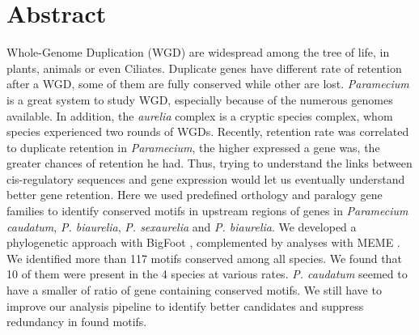 \section*{Abstract}

Whole-Genome Duplication (WGD) are widespread among the tree of life, in plants, animals or even Ciliates. Duplicate genes have different rate of retention after a WGD, some of them are fully conserved while other are lost. \textit{Paramecium} is a great system to study WGD, especially because of the numerous genomes available. In addition, the \textit{aurelia} complex is a cryptic species complex, whom species experienced two rounds of WGDs. Recently, retention rate was correlated to duplicate retention in \textit{Paramecium}, the higher expressed a gene was, the greater chances of retention he had. Thus, trying to understand the links between cis-regulatory sequences and gene expression would let us eventually understand better gene retention. Here we used predefined orthology and paralogy gene families \citep{mcgrath_insights_2014} to identify conserved motifs in upstream regions of genes in \textit{Paramecium caudatum}, \textit{P. biaurelia}, \textit{P. sexaurelia} and \textit{P. biaurelia}. We developed a phylogenetic approach with BigFoot \citep{satija_bigfoot:_2009}, complemented by analyses with MEME \citep{bailey_meme:_2006}. We identified more than 117 motifs conserved among all species. We found that 10 of them were present in the 4 species at various rates. \textit{P. caudatum} seemed to have a smaller of ratio of gene containing conserved motifs. We still have to improve our analysis pipeline to identify better candidates and suppress redundancy in found motifs.